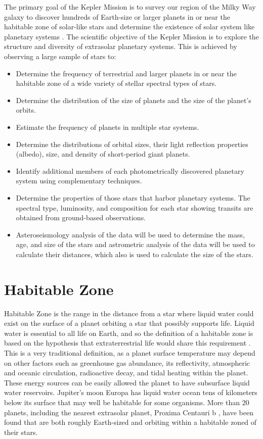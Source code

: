 The primary goal of the Kepler Mission is to survey our region of the Milky Way galaxy to discover hundreds of Earth-size or larger planets in or near the habitable zone of solar-like stars and determine the existence of solar system like planetary systems \cite{2014PNAS..11112647B}. The scientific objective of the Kepler Mission is to explore the structure and diversity of extrasolar planetary systems. This is achieved by observing a large sample of stars to:
\begin{itemize}
  \item Determine the frequency of terrestrial and larger planets in or near the habitable zone of a wide variety of stellar spectral types of stars. 
  \item Determine the distribution of the size of planets and the size of the planet’s orbits.
  \item Estimate the frequency of planets in multiple star systems.
  \item Determine the distributions of orbital sizes, their light reflection properties (albedo), size, and density of
short-period giant planets.
  \item Identify additional members of each photometrically discovered planetary system using complementary techniques. 
  \item Determine the properties of those stars that harbor planetary systems. The spectral type, luminosity, and composition for each star showing transits are obtained from ground-based observations.
  \item Asteroseismology analysis of the data will be used to determine the mass, age, and size of the stars and astrometric analysis of the data will be used to calculate their distances, which also is used to calculate the size of the stars.
\end{itemize}

\section{Habitable Zone}

Habitable Zone is the range in the distance from a star where liquid water could exist on the surface of a planet orbiting a star that possibly supports life. Liquid water is essential to all life on Earth, and so the definition of a habitable zone is based on the hypothesis that extraterrestrial life would share this requirement \cite{2014ApJ...787L..29K}. This is a very traditional definition, as a planet surface temperature may depend on other factors such as greenhouse gas abundance, its reflectivity, atmospheric and oceanic circulation, radioactive decay, and tidal heating within the planet. These energy sources can be easily allowed the planet to have subsurface liquid water reservoirs.  Jupiter's moon Europa has liquid water ocean tens of kilometers below its surface that may well be habitable for some organisms. More than 20 planets, including the nearest extrasolar planet, Proxima Centauri b \cite{2016Natur.536..437A}, have been found that are both roughly Earth-sized and orbiting within a habitable zoned of their stars. 

